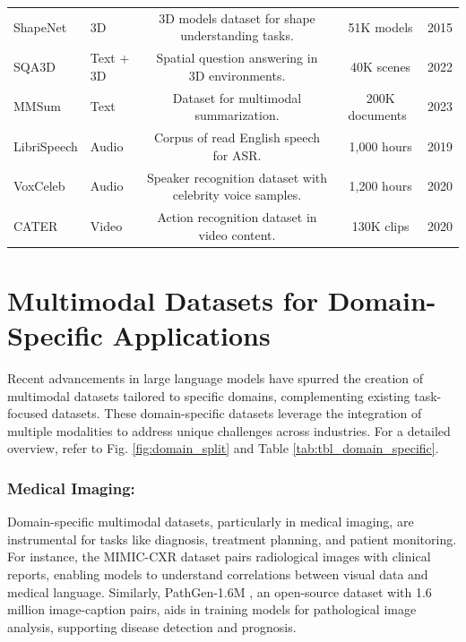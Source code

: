 \documentclass[runningheads]{llncs}
\begin{document}
\begin{table}[tbp]
{\begin{tabular}{l l c c r}
                ShapeNet & 3D & 3D models dataset for shape understanding tasks. & ~51K models & 2015\\
                SQA3D & Text + 3D & Spatial question answering in 3D environments. & ~40K scenes & 2022\\
                MMSum & Text & Dataset for multimodal summarization. & ~200K documents & 2023\\
                LibriSpeech & Audio & Corpus of read English speech for ASR. & ~1,000 hours & 2019\\
                VoxCeleb & Audio & Speaker recognition dataset with celebrity voice samples. & ~1,200 hours & 2020\\
                CATER & Video & Action recognition dataset in video content. & ~130K clips & 2020\\
                

    		\end{tabular}
    	}
    	
    	\end{table}


\section{Multimodal Datasets for Domain-Specific Applications}

Recent advancements in large language models have spurred the creation of multimodal datasets tailored to specific domains, complementing existing task-focused datasets. These domain-specific datasets leverage the integration of multiple modalities to address unique challenges across industries. For a detailed overview, refer to Fig. \ref{fig:domain_split} and Table \ref{tab:tbl_domain_specific}.

\subsubsection{Medical Imaging:}
Domain-specific multimodal datasets, particularly in medical imaging, are instrumental for tasks like diagnosis, treatment planning, and patient monitoring. For instance, the MIMIC-CXR dataset \cite{ref99} pairs radiological images with clinical reports, enabling models to understand correlations between visual data and medical language. Similarly, PathGen-1.6M \cite{ref44}, an open-source dataset with 1.6 million image-caption pairs, aids in training models for pathological image analysis, supporting disease detection and prognosis.
\end{document}
